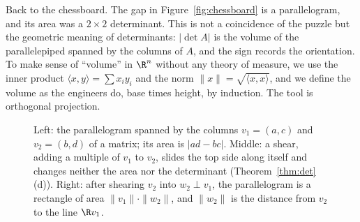 Back to the chessboard. The gap in Figure~\ref{fig:chessboard} is a parallelogram, and its area was a $2\times2$ determinant. This is not a coincidence of the puzzle but the geometric meaning of determinants: $|\det A|$ is the volume of the parallelepiped spanned by the columns of $A$, and the sign records the orientation. To make sense of ``volume'' in $\R^n$ without any theory of measure, we use the inner product $\langle x,y\rangle=\sum x_iy_i$ and the norm $\|x\|=\sqrt{\langle x,x\rangle}$, and we define the volume as the engineers do, base times height, by induction. The tool is orthogonal projection.

\begin{figure}[ht]
\centering
{}
\caption{Left: the parallelogram spanned by the columns $v_1=(a,c)$ and $v_2=(b,d)$ of a matrix; its area is $|ad-bc|$. Middle: a shear, adding a multiple of $v_1$ to $v_2$, slides the top side along itself and changes neither the area nor the determinant (Theorem~\ref{thm:det}(d)). Right: after shearing $v_2$ into $w_2\perp v_1$, the parallelogram is a rectangle of area $\|v_1\|\cdot\|w_2\|$, and $\|w_2\|$ is the distance from $v_2$ to the line $\R v_1$.}
\label{fig:parallelogram}
\end{figure}

